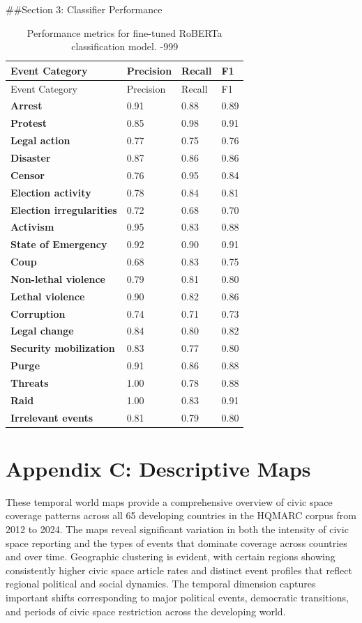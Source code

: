 \documentclass[
  letterpaper,
  DIV=11,
  numbers=noendperiod]{scrartcl}
\begin{document}
\#\#Section 3: Classifier Performance

\begin{longtable}[]{@{}llll@{}}
\caption{Performance metrics for fine-tuned RoBERTa classification
model. -999}\label{tbl-roberta}\tabularnewline
\toprule\noalign{}
Event Category & Precision & Recall & F1 \\
\midrule\noalign{}
\endfirsthead
\toprule\noalign{}
Event Category & Precision & Recall & F1 \\
\midrule\noalign{}
\endhead
\bottomrule\noalign{}
\endlastfoot
\textbf{Arrest} & 0.91 & 0.88 & 0.89 \\
\textbf{Protest} & 0.85 & 0.98 & 0.91 \\
\textbf{Legal action} & 0.77 & 0.75 & 0.76 \\
\textbf{Disaster} & 0.87 & 0.86 & 0.86 \\
\textbf{Censor} & 0.76 & 0.95 & 0.84 \\
\textbf{Election activity} & 0.78 & 0.84 & 0.81 \\
\textbf{Election irregularities} & 0.72 & 0.68 & 0.70 \\
\textbf{Activism} & 0.95 & 0.83 & 0.88 \\
\textbf{State of Emergency} & 0.92 & 0.90 & 0.91 \\
\textbf{Coup} & 0.68 & 0.83 & 0.75 \\
\textbf{Non-lethal violence} & 0.79 & 0.81 & 0.80 \\
\textbf{Lethal violence} & 0.90 & 0.82 & 0.86 \\
\textbf{Corruption} & 0.74 & 0.71 & 0.73 \\
\textbf{Legal change} & 0.84 & 0.80 & 0.82 \\
\textbf{Security mobilization} & 0.83 & 0.77 & 0.80 \\
\textbf{Purge} & 0.91 & 0.86 & 0.88 \\
\textbf{Threats} & 1.00 & 0.78 & 0.88 \\
\textbf{Raid} & 1.00 & 0.83 & 0.91 \\
\textbf{Irrelevant events} & 0.81 & 0.79 & 0.80 \\
\end{longtable}

\section{Appendix C: Descriptive
Maps}\label{appendix-c-descriptive-maps}

These temporal world maps provide a comprehensive overview of civic
space coverage patterns across all 65 developing countries in the HQMARC
corpus from 2012 to 2024. The maps reveal significant variation in both
the intensity of civic space reporting and the types of events that
dominate coverage across countries and over time. Geographic clustering
is evident, with certain regions showing consistently higher civic space
article rates and distinct event profiles that reflect regional
political and social dynamics. The temporal dimension captures important
shifts corresponding to major political events, democratic transitions,
and periods of civic space restriction across the developing world.
\end{document}
